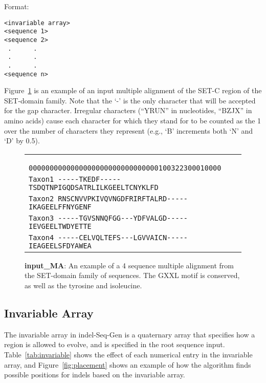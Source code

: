 \documentclass[10pt]{article}
\begin{document}
Format:
\begin{verbatim}
<invariable array>
<sequence 1>
<sequence 2>
 .      .
 .      .
 .      .
<sequence n>
\end{verbatim}

Figure~\ref{fig:input_MA} is an example of an input multiple alignment of the SET-C region of the SET-domain family. Note that the `-' is the only character that will be accepted for the gap character. Irregular characters (``YRUN'' in nucleotides, ``BZJX'' in amino acids) cause each character for which they stand for to be counted as the 1 over the number of characters they represent (e.g., `B' increments both `N' and `D' by 0.5).

\begin{figure}[Htbp]
\centering
\begin{tabular}{l}
\verb+       0000000000000000000000000000000100322300010000+\\
\verb+Taxon1 -----TKEDF-----TSDQTNPIGQDSATRLILKGEELTCNYKLFD+\\
\verb+Taxon2 RNSCNVVPKIVQVNGDFRIRFTALRD-----IKAGEELFFNYGENF+\\
\verb+Taxon3 -----TGVSNNQFGG---YDFVALGD-----IEVGEELTWDYETTE+\\
\verb+Taxon4 -----CELVQLTEFS---LGVVAICN-----IEAGEELSFDYAWEA+\\
\end{tabular}
\caption{{\bf input\_MA}: An example of a 4 sequence multiple alignment from the
SET-domain family of sequences.  The GXXL motif is conserved, as well as the tyrosine and
isoleucine.}
\label{fig:input_MA}
\end{figure}

\subsection{Invariable Array}

The invariable array in indel-Seq-Gen is a quaternary array that specifies how a region is
allowed to evolve, and is specified in the root sequence input. Table~\ref{tab:invariable}
shows the effect of each numerical entry in the invariable array, and Figure~\ref{fig:placement} shows an example of how the algorithm finds possible positions for indels based on the invariable array.
\end{document}
